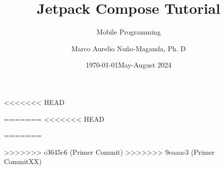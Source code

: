 \documentclass[pdf,
serif,
compress,
xcolor=table,
dvipsnames,
spanish,
aspectratio=169]{beamer}
\date{\specialdate\today}
\title[Arrays]{Jetpack Compose Tutorial}
\subtitle[short]{Mobile Programming}
\author[-]{Marco Aurelio Nuño-Maganda, Ph. D}
\institute[UPV]{Polytechnic University of Victoria}
\date[]{May-August 2024}
\newcommand{\rutaImagenes}{}
\begin{document}
\begin{frame}
    \titlepage
\end{frame}



<<<<<<< HEAD
%

%
=======
<<<<<<< HEAD
\renewcommand{\rutaImagenes}{Estudiante1/imgs}


\renewcommand{\rutaImagenes}{Estudiante2/imgs}

=======
%

%
>>>>>>> c3645c6 (Primer Commit)
>>>>>>> 9eaaac3 (Primer CommitXX)
\end{document}
